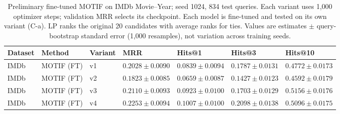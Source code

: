 \begin{table}[htbp]
\centering
\small
\renewcommand{\arraystretch}{1.15}
\setlength{\tabcolsep}{5pt}
\begin{adjustbox}{max width=\linewidth}
\begin{tabular}{|l|l|l|l|l|l|l|}
\hline
\textbf{Dataset} & \textbf{Method} & \textbf{Variant} & \textbf{MRR} & \textbf{Hits@1} & \textbf{Hits@3} & \textbf{Hits@10} \\
\hline
IMDb & MOTIF (FT) & v1 & $0.2028 \pm 0.0090$ & $0.0839 \pm 0.0094$ & $0.1787 \pm 0.0131$ & $0.4772 \pm 0.0173$ \\
\hline
IMDb & MOTIF (FT) & v2 & $0.1823 \pm 0.0085$ & $0.0659 \pm 0.0087$ & $0.1427 \pm 0.0123$ & $0.4592 \pm 0.0179$ \\
\hline
IMDb & MOTIF (FT) & v3 & $0.2110 \pm 0.0093$ & $0.0923 \pm 0.0100$ & $0.1703 \pm 0.0129$ & $0.5156 \pm 0.0176$ \\
\hline
IMDb & MOTIF (FT) & v4 & $0.2253 \pm 0.0094$ & $0.1007 \pm 0.0100$ & $0.2098 \pm 0.0138$ & $0.5096 \pm 0.0175$ \\
\hline
\end{tabular}
\end{adjustbox}
\caption{Preliminary fine-tuned MOTIF on IMDb Movie--Year; seed 1024, 834 test queries. Each variant uses 1,000 optimizer steps; validation MRR selects its checkpoint. Each model is fine-tuned and tested on its own variant (C-a). LP ranks the original 20 candidates with average ranks for ties. Values are estimates $\pm$ query-bootstrap standard error (1,000 resamples), not variation across training seeds.}
\label{tab:motif-imdb-movie-year-matrix-link_prediction-diagonal}
\end{table}
